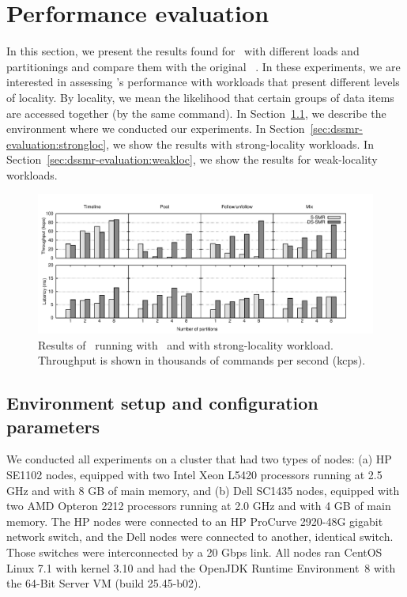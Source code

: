 \section{Performance evaluation}
\label{sec:dssmr-experiments}

In this section, we present the results found for \dssmrappname\ with different
loads and partitionings and compare them with the original
\ssmr{}~\cite{bezerra2014ssmr}. In these experiments, we are interested in
assessing \dssmr{}'s performance with workloads that present different levels of
locality. By locality, we mean the likelihood that certain groups of data items
are accessed together (by the same command). In
Section~\ref{sec:dssmr-evaluation:setup}, we describe the environment where we
conducted our experiments. In Section~\ref{sec:dssmr-evaluation:strongloc}, we
show the results with strong-locality workloads.
In Section~\ref{sec:dssmr-evaluation:weakloc}, we show the results for
weak-locality workloads.

\begin{figure}
\begin{minipage}[b]{1\linewidth}
\centering
      \includegraphics[width=1.08\linewidth]{figures/experiments/dssmr/strong-locality}
\end{minipage}
\caption{Results of \dssmrappname\ running with \ssmr\ and \dssmr{} with strong-locality workload. Throughput is shown in thousands of commands per second (kcps).}
\label{fig:dssmr-strongloc}
\end{figure}

\subsection{Environment setup and configuration parameters}
\label{sec:dssmr-evaluation:setup}

We conducted all experiments on a cluster that had two types of nodes: (a) HP
SE1102 nodes, equipped with two Intel Xeon L5420 processors running at 2.5 GHz
and with 8 GB of main memory, and (b) Dell SC1435 nodes, equipped with two AMD
Opteron 2212 processors running at 2.0 GHz and with 4 GB of main memory. The HP
nodes were connected to an HP ProCurve 2920-48G gigabit network switch, and the
Dell nodes were connected to another, identical switch. Those switches were
interconnected by a 20 Gbps link. All nodes ran CentOS Linux 7.1 with kernel
3.10 and had the OpenJDK Runtime Environment~8 with the \mbox{64-Bit} Server VM
(build 25.45-b02).

